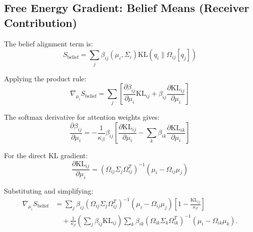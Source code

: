 \documentclass[11pt]{article}
\begin{document}
\subsection*{Free Energy Gradient: Belief Means (Receiver Contribution)}

The belief alignment term is:
\begin{equation}
S_{\mathrm{belief}} = \sum_j \beta_{ij}(\mu_i, \Sigma_i)  \mathrm{KL}(q_i \| \Omega_{ij}[q_j])
\end{equation}

Applying the product rule:
\begin{equation}
\nabla_{\mu_i} S_{\mathrm{belief}} = \sum_j \left[ \frac{\partial \beta_{ij}}{\partial \mu_i} \mathrm{KL}_{ij} + \beta_{ij} \frac{\partial \mathrm{KL}_{ij}}{\partial \mu_i} \right]
\end{equation}

The softmax derivative for attention weights gives:
\begin{equation}
\frac{\partial \beta_{ij}}{\partial \mu_i} = -\frac{1}{\kappa_\beta} \beta_{ij} \left[\frac{\partial \mathrm{KL}_{ij}}{\partial \mu_i} - \sum_k \beta_{ik} \frac{\partial \mathrm{KL}_{ik}}{\partial \mu_i}\right]
\end{equation}

For the direct KL gradient:
\begin{equation}
\frac{\partial \mathrm{KL}_{ij}}{\partial \mu_i} = (\Omega_{ij}\Sigma_j\Omega_{ij}^T)^{-1}(\mu_i - \Omega_{ij}\mu_j)
\end{equation}

Substituting and simplifying:
\begin{align}
\nabla_{\mu_i} S_{\mathrm{belief}} &= \sum_j \beta_{ij} (\Omega_{ij}\Sigma_j\Omega_{ij}^T)^{-1}(\mu_i - \Omega_{ij}\mu_j) \left[1 - \frac{\mathrm{KL}_{ij}}{\kappa_\beta}\right] \nonumber \\
&\quad + \frac{1}{\kappa_\beta}\left(\sum_j \beta_{ij}\mathrm{KL}_{ij}\right) \sum_k \beta_{ik} (\Omega_{ik}\Sigma_k\Omega_{ik}^T)^{-1}(\mu_i - \Omega_{ik}\mu_k).
\end{align}
\end{document}
